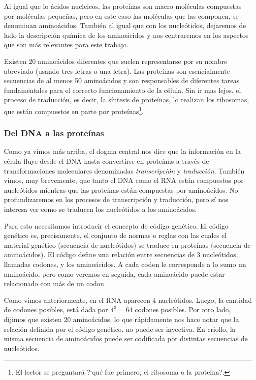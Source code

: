 Al igual que lo \'acidos nucleicos, las prote\'inas son macro mol\'eculas
compuestas por mol\'eculas peque\~nas, pero en este caso las mol\'eculas que
las componen, se denominan amino\'acidos. Tambi\'en al igual que con los
nucle\'otidos, dejaremos de lado la descripci\'on qu\'imica de los
amino\'acidos y nos centraremos en los aspectos que son m\'as relevantes para
este trabajo.

Existen 20 amino\'acidos diferentes que suelen representarse por su nombre
abreviado (usando tres letras o una letra). Las prote\'inas son esencialmente
secuencias de al menos 50 amino\'acidos y son responsables de diferentes tareas
fundamentales para el correcto funcionamiento de la c\'elula. Sin ir mas lejos,
el proceso de traducci\'on, es decir, la s\'intesis de prote\'inas, lo realizan
los ribosomas, que est\'an compuestos en parte por prote\'inas\footnote{El
lector se preguntar\'a ?`qu\'e fue primero, el ribosoma o la prote\'ina?.}.

\subsubsection{Del \ac{DNA} a las prote\'inas}

Como ya vimos m\'as arriba, el dogma central nos dice que la informaci\'on en la
c\'elula fluye desde el \ac{DNA} hasta convertirse en prote\'inas a trav\'es de
transformaciones moleculares denominadas \textit{transcripci\'on} y
\textit{traducci\'on}. Tambi\'en vimos, muy brevemente, que tanto el \ac{DNA}
como el \ac{RNA} est\'an compuestos por nucle\'otidos mientras que las
prote\'inas est\'an compuestas por amino\'acidos. No profundizaremos en los
procesos de transcripci\'on y traducci\'on, pero s\'i nos interesa ver como se
traducen los nucle\'otidos a los amino\'acidos.

Para esto necesitamos introducir el concepto de c\'odigo gen\'etico. El
c\'odigo gen\'etico es, precisamente, el conjunto de normas o reglas con las
cuales el material gen\'etico (secuencia de nucle\'otidos) se traduce en
prote\'inas (secuencia de amino\'acidos). El c\'odigo define una relaci\'on
entre secuencias de 3 nucle\'otidos, llamadas codones, y los amino\'acidos. A
cada codon le corresponde a lo sumo un amino\'acido, pero como veremos en
seguida, cada amino\'acido puede estar relacionado con m\'as de un codon.

Como vimos anteriormente, en el \ac{RNA} aparecen 4 nucle\'otidos. Luego,
la cantidad de codones posibles, est\'a dada por $4^{3} = 64$ codones
posibles. Por otro lado, dijimos que existen 20 amino\'acidos, lo que
r\'apidamente nos hace notar que la relaci\'on definida por el c\'odigo
gen\'etico, no puede ser inyectiva. En criollo, la misma secuencia de
amino\'acidos puede ser codificada por distintas secuencias de
nucle\'otidos.

